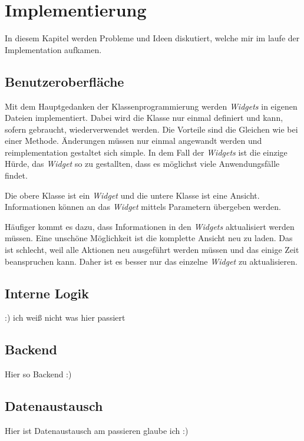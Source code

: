 \chapter{Implementierung}
\label{section:programmierung}
In diesem Kapitel werden Probleme und Ideen diskutiert, welche mir im laufe der Implementation aufkamen.



\section{Benutzeroberfläche}
Mit dem Hauptgedanken der Klassenprogrammierung werden \textit{Widgets} in eigenen Dateien implementiert. Dabei wird die Klasse nur einmal definiert und kann, sofern gebraucht, wiederverwendet werden. Die Vorteile sind die Gleichen wie bei einer Methode. Änderungen müssen nur einmal angewandt werden und reimplementation gestaltet sich simple. In dem Fall der \textit{Widgets} ist die einzige Hürde, das \textit{Widget} so zu gestallten, dass es möglichst viele Anwendungsfälle findet.


Die obere Klasse ist ein \textit{Widget} und die untere Klasse ist eine Ansicht. Informationen können an das \textit{Widget} mittels Parametern übergeben werden.

Häufiger kommt es dazu, dass Informationen in den \textit{Widgets} aktualisiert werden müssen. Eine unschöne Möglichkeit ist die komplette Ansicht neu zu laden. Das ist schlecht, weil alle Aktionen neu ausgeführt werden müssen und das einige Zeit beanspruchen kann. Daher ist es besser nur das einzelne \textit{Widget} zu aktualisieren.

\section{Interne Logik}
:) ich weiß nicht was hier passiert

\section{Backend}
Hier so Backend :)

\section{Datenaustausch}
Hier ist Datenaustausch am passieren glaube ich :)
